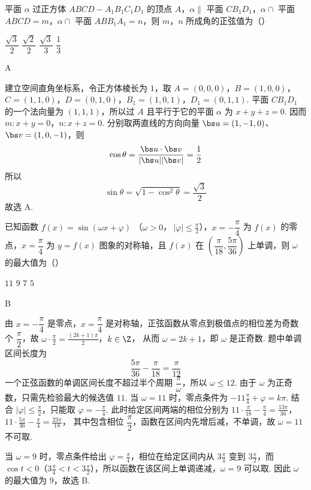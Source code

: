 \begin{problem}
平面 \(\alpha\) 过正方体 \(ABCD-A_1B_1C_1D_1\) 的顶点 \(A\)，\(\alpha\parallel\) 平面 \(CB_1D_1\)，\(\alpha\cap\) 平面 \(ABCD=m\)，\(\alpha\cap\) 平面 \(ABB_1A_1=n\)，则 \(m\)，\(n\) 所成角的正弦值为（\quad）

\choices
    {\(\dfrac{\sqrt3}{2}\)}
    {\(\dfrac{\sqrt2}{2}\)}
    {\(\dfrac{\sqrt3}{3}\)}
    {\(\dfrac13\)}
\end{problem}

\begin{answer}
A
\end{answer}

\begin{solution}
建立空间直角坐标系，令正方体棱长为 \(1\)，取
\(A=(0,0,0)\)，\(B=(1,0,0)\)，\(C=(1,1,0)\)，\(D=(0,1,0)\)，\(B_1=(1,0,1)\)，\(D_1=(0,1,1)\).
平面 \(CB_1D_1\) 的一个法向量为 \((1,1,1)\)，所以过 \(A\) 且平行于它的平面 \(\alpha\) 为 \(x+y+z=0\). 因而
\(m: x+y=0\)，\(n: x+z=0\).
分别取两直线的方向向量 \(\bs u=(1,-1,0)\)、\(\bs v=(1,0,-1)\)，则
\[
\cos\theta=\frac{\bs u\cdot\bs v}{|\bs u||\bs v|}=\frac12
\]
所以
\[
\sin\theta=\sqrt{1-\cos^2\theta}=\frac{\sqrt3}{2}
\]
故选 A.
\end{solution}



\begin{problem}
已知函数 \(f(x)=\sin(\omega x+\varphi)\) （\(\omega>0\)，\(\ |\varphi|\le \frac{\pi}{2}\)），\(x=-\dfrac{\pi}{4}\) 为 \(f(x)\) 的零点，\(x=\dfrac{\pi}{4}\) 为 \(y=f(x)\) 图象的对称轴，且 \(f(x)\) 在 \(\left(\dfrac{\pi}{18},\dfrac{5\pi}{36}\right)\) 上单调，则 \(\omega\) 的最大值为（\quad）

\choices
    {\(11\)}
    {\(9\)}
    {\(7\)}
    {\(5\)}
\end{problem}

\begin{answer}
B
\end{answer}

\begin{solution}
由 \(x=-\dfrac\pi4\) 是零点，\(x=\dfrac\pi4\) 是对称轴，正弦函数从零点到极值点的相位差为奇数个 \(\dfrac\pi2\)，故
\(\omega\cdot\frac\pi2=\frac{(2k+1)\pi}{2}\)，\(k\in\Z\)，
从而 \(\omega=2k+1\)，即 \(\omega\) 是正奇数. 题中单调区间长度为
\[
\frac{5\pi}{36}-\frac\pi{18}=\frac\pi{12}
\]
一个正弦函数的单调区间长度不超过半个周期 \(\dfrac\pi\omega\)，所以 \(\omega\leqslant12\). 由于 \(\omega\) 为正奇数，只需先检验最大的候选值 \(11\). 当 \(\omega=11\) 时，零点条件为 \(-11\frac{\pi}{4}+\varphi=k\pi\). 结合 \(|\varphi|\leqslant\frac{\pi}{2}\)，只能取 \(\varphi=-\frac{\pi}{4}\). 此时给定区间两端的相位分别为
\(11\cdot\frac\pi{18}-\frac\pi4=\frac{13\pi}{36}\)，\(11\cdot\frac{5\pi}{36}-\frac\pi4=\frac{23\pi}{18}\)，
其中包含相位 \(\dfrac\pi2\)，函数在区间内先增后减，不单调，故 \(\omega=11\) 不可取.

当 \(\omega=9\) 时，零点条件给出 \(\varphi=\frac{\pi}{4}\)，相位在给定区间内从 \(3\frac{\pi}{4}\) 变到 \(3\frac{\pi}{2}\)，而 \(\cos t<0\)（\(3\frac{\pi}{4}<t<3\frac{\pi}{2}\)），所以函数在该区间上单调递减，\(\omega=9\) 可以取. 因此 \(\omega\) 的最大值为 \(9\)，故选 B.
\end{solution}


